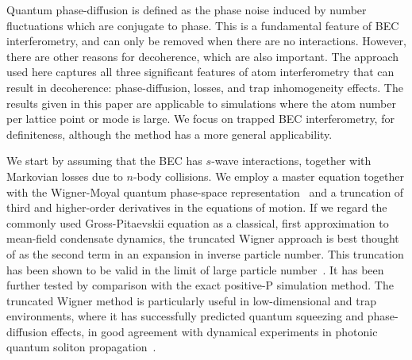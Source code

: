\documentclass[doublecol]{epl2}
\begin{document}
Quantum phase-diffusion is defined as the phase noise induced by number fluctuations
which are conjugate to phase.
This is a fundamental feature of BEC interferometry, and can only be removed when there are no interactions.
However, there are other reasons for decoherence, which are also important.
The approach used here captures all three significant features of atom
interferometry that can result in decoherence: phase-diffusion, losses,
and trap inhomogeneity effects.
The results given in this paper are applicable to simulations where the
atom number per lattice point or mode is large.
We focus on trapped BEC interferometry, for definiteness, although the method has a more general applicability.

We start by assuming that the BEC has $s$-wave interactions,
together with Markovian losses due to $n$-body collisions.
We employ a master equation together with the Wigner-Moyal quantum phase-space representation~\cite{Gardiner2004}
and a truncation of third and higher-order derivatives in the equations of motion.
If we regard the commonly used Gross-Pitaevskii equation as a classical,
first approximation to mean-field condensate dynamics,
the truncated Wigner approach is best thought of as the second term in an expansion in inverse particle number.
This truncation has been shown to be valid in the limit of large particle
number~\cite{Drummond1993,Steel1998,Sinatra2002}.
It has been further tested by comparison with the exact positive-P simulation method.
The truncated Wigner method is particularly useful in low-dimensional and
trap environments, where it has successfully predicted quantum squeezing
and phase-diffusion effects, in good agreement with dynamical experiments
in photonic quantum soliton propagation~\cite{Carter1987,Corney2008}.
\end{document}
